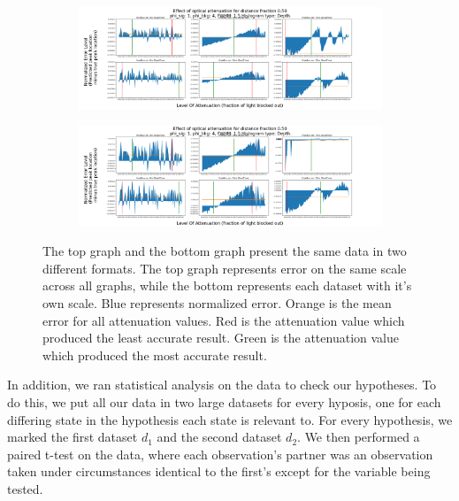 \documentclass{article}
\begin{document}
\begin{figure}[H]
\centering
\begin{subfigure}[b]{1\textwidth}
\includegraphics[width=1\linewidth]{SharedyExample.png}
\label{fig:Ng1}
\end{subfigure}
\begin{subfigure}[b]{1\textwidth}
\includegraphics[width=1\linewidth]{ZoomedyExample.png}
\label{fig:Ng2}
\end{subfigure}
\caption{\label{fig:Data}The top graph and the bottom graph present the same data in two different formats. The top graph represents error on the same scale across all graphs, while the bottom represents each dataset with it's own scale. Blue represents normalized error. Orange is the mean error for all attenuation values. Red is the attenuation value which produced the least accurate result. Green is the attenuation value which produced the most accurate result.}

\end{figure}

In addition, we ran statistical analysis on the data to check our hypotheses. To do this, we put all our data in two large datasets for every hyposis, one for each differing state in the hypothesis each state is relevant to. For every hypothesis, we marked the first dataset $d_{1}$ and the second dataset $d_{2}$. We then performed a paired t-test on the data, where each observation's partner was an observation taken under circumstances identical to the first's except for the variable being tested. 
\end{document}
